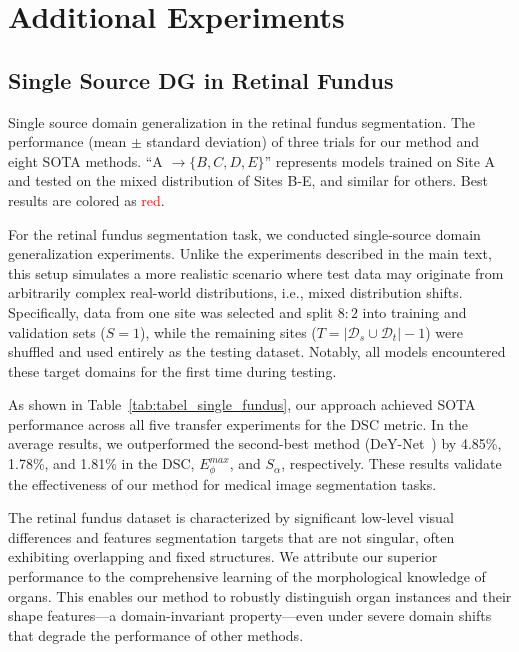 \section{Additional Experiments}
\subsection{Single Source DG in Retinal Fundus}
\begin{table}[h!]
\centering
  \caption{Single source domain generalization in the retinal fundus segmentation. The performance (mean $\pm$ standard deviation) of three trials for our method and eight SOTA methods. ``A $\rightarrow \{B,C,D,E\}$'' represents models trained on Site A and tested on the mixed distribution of Sites B-E, and similar for others. Best results are colored as \textcolor{red}{red}.}
  \begin{adjustbox}{width=0.99\linewidth}
    
  \end{adjustbox}
  \label{tab:tabel_single_fundus}
\end{table}

For the retinal fundus segmentation task, we conducted single-source domain generalization experiments. Unlike the experiments described in the main text, this setup simulates a more realistic scenario where test data may originate from arbitrarily complex real-world distributions, i.e., mixed distribution shifts. Specifically, data from one site was selected and split $8:2$ into training and validation sets ($S=1$), while the remaining sites ($T=|\mathcal{D}_s \cup \mathcal{D}_t|-1$) were shuffled and used entirely as the testing dataset. Notably, all models encountered these target domains for the first time during testing.

As shown in Table~\ref{tab:tabel_single_fundus}, our approach achieved SOTA performance across all five transfer experiments for the DSC metric. In the average results, we outperformed the second-best method (DeY-Net~\cite{wen2024denoising}) by 4.85\%, 1.78\%, and 1.81\% in the DSC, $E_\phi^{max}$, and $S_{\alpha}$, respectively. These results validate the effectiveness of our method for medical image segmentation tasks.
        
The retinal fundus dataset is characterized by significant low-level visual differences and features segmentation targets that are not singular, often exhibiting overlapping and fixed structures. We attribute our superior performance to the comprehensive learning of the morphological knowledge of organs. This enables our method to robustly distinguish organ instances and their shape features—a domain-invariant property—even under severe domain shifts that degrade the performance of other methods.

